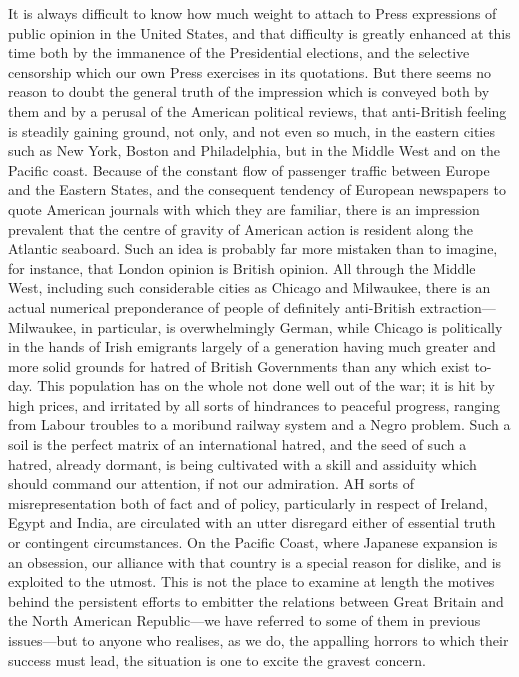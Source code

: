 \documentclass{book}
\begin{document}
It is always difficult to know how much weight to attach to Press expressions of public opinion in the United States, and that difficulty is greatly enhanced at this time both by the immanence of the Presidential elections, and the selective censorship which our own Press exercises in its quotations. But there seems no reason to doubt the general truth of the impression which is conveyed both by them and by a perusal of the American political reviews, that anti-British feeling is steadily gaining ground, not only, and not even so much, in the eastern cities such as New York, Boston and Philadelphia, but in the Middle West and on the Pacific coast. Because of the constant flow of passenger traffic between Europe and the Eastern States, and the consequent tendency of European newspapers to quote American journals with which they are familiar, there is an impression prevalent that the centre of gravity of American action is resident along the Atlantic seaboard. Such an idea is probably far more mistaken than to imagine, for instance, that London opinion is British opinion. All through the Middle West, including such considerable cities as Chicago and Milwaukee, there is an actual numerical preponderance of people of definitely anti-British extraction—Milwaukee, in particular, is overwhelmingly German, while Chicago is politically in the hands of Irish emigrants largely of a generation having much greater and more solid grounds for hatred of British Governments than any which exist to-day. This population has on the whole not done well out of the war; it is hit by high prices, and irritated by all sorts of hindrances to peaceful progress, ranging from Labour troubles to a moribund railway system and a Negro problem. Such a soil is the perfect matrix of an international hatred, and the seed of such a hatred, already dormant, is being cultivated with a skill and assiduity which should command our attention, if not our admiration. AH sorts of misrepresentation both of fact and of policy, particularly in respect of Ireland, Egypt and India, are circulated with an utter disregard either of essential truth or contingent circumstances. On the Pacific Coast, where Japanese expansion is an obsession, our alliance with that country is a special reason for dislike, and is exploited to the utmost. This is not the place to examine at length the motives behind the persistent efforts to embitter the relations between Great Britain and the North American Republic—we have referred to some of them in previous issues—but to anyone who realises, as we do, the appalling horrors to which their success must lead, the situation is one to excite the gravest concern.
\end{document}
